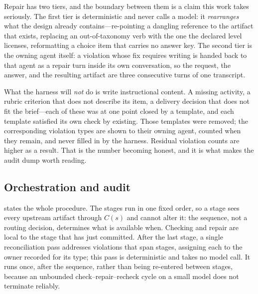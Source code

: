 Repair has two tiers, and the boundary between them is a claim this work takes
seriously. The first tier is deterministic and never calls a model: it
\emph{rearranges} what the design already contains---re-pointing a dangling
reference to the artifact that exists, replacing an out-of-taxonomy verb with the
one the declared level licenses, reformatting a choice item that carries no answer
key. The second tier is the owning agent itself: a violation whose fix requires
writing is handed back to that agent as a repair turn inside its own conversation,
so the request, the answer, and the resulting artifact are three consecutive turns
of one transcript.

What the harness will \emph{not} do is write instructional content. A missing
activity, a rubric criterion that does not describe its item, a delivery decision
that does not fit the brief---each of these was at one point closed by a template,
and each template satisfied its own check by existing. Those templates were removed;
the corresponding violation types are shown to their owning agent, counted when they
remain, and never filled in by the harness. Residual violation counts are higher as
a result. That is the number becoming honest, and it is what makes the audit dump
worth reading.

\subsection{Orchestration and audit}
\label{sec:orchestration}

 states the whole procedure. The stages run in one fixed order,
so a stage sees every upstream artifact through $C(s)$ and cannot alter it: the
sequence, not a routing decision, determines what is available when. Checking and
repair are local to the stage that has just committed. After the last stage, a
single reconciliation pass addresses violations that span stages, assigning each to
the owner recorded for its type; this pass is deterministic and takes no model call.
It runs once, after the sequence, rather than being re-entered between stages,
because an unbounded check--repair--recheck cycle on a small model does not
terminate reliably.

